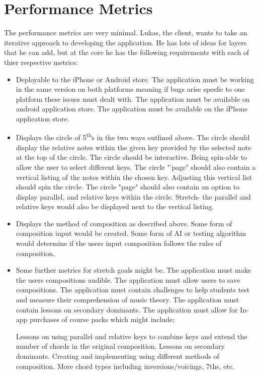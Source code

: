 \documentclass[onecolumn, draftclsnofoot,10pt, compsoc]{IEEEtran}
\begin{document}
    \section{Performance Metrics}
     \par
    The performance metrics are very minimal.
    Lukas, the client, wants to take an iterative approach to developing the application.
    He has lots of ideas for layers that he can add, but at the core he has the following requirements with each of thier respective metrics:
    \begin{itemize}
	\item Deployable to the iPhone or Android store.
		\subitem The application must be working in the same version on both platforms meaning if bugs arise spesfic to one platform these issues must dealt with.
		\subitem The application must be available on android application store.
		\subitem The application must be available on the iPhone application store.
	\item Displays the circle of 5\textsuperscript{th}s in the two ways outlined above.
		\subitem The circle should display the relative notes within the given key provided by the selected note at the top of the circle.
		\subitem The circle should be interactive. Being spin-able to allow the user to select different keys.
		\subitem The circle "'page" should also contain a vertical listing of the notes within the chosen key.
		\subitem Adjusting this vertical list should spin the circle.
		\subitem The circle "page" should also contain an option to display parallel, and relative keys within the circle.
		\subitem Stretch- the parallel and relative keys would also be displayed next to the vertical listing.
	\item Displays the method of composition as described above.
		\subitem Some form of composition input would be created.
		\subitem Some form of AI or testing algorithm would determine if the users input composition follows the rules of composition.
	\item Some further metrics for stretch goals might be.
		\subitem The application must make the users compositions audible.
		\subitem The application must allow users to save compositions.
		\subitem The application must contain challenges to help students test and measure their comprehension of music theory.
		\subitem The application must contain lessons on secondary dominants.
		\subitem The application must allow for In-app purchases of course packs which might include;
		\begin{itemize}
			\subitem Lessons on using parallel and relative keys to combine keys and extend the number of chords in the original composition.
			\subitem Lessons on secondary dominants.
			\subitem Creating and implementing using different methods of composition.
			\subitem More chord types including inversions/voicings, 7ths, etc.
		\end{itemize}
	\end{itemize}
    

    
    
\end{document}

